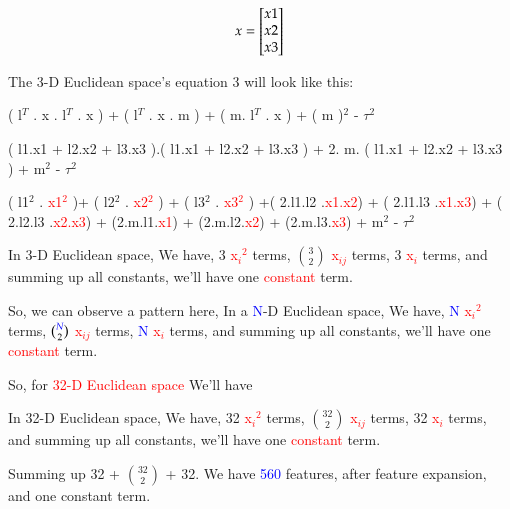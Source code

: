 \documentclass[11 pt]{article}
\begin{document}
{\[
x = \begin{bmatrix} x1 \\ x2 \\ x3 \\ \end{bmatrix}
\]

\vspace{\baselineskip}
The 3-D Euclidean space's equation 3 will look like this:

( l$^T$ . x . l$^T$ . x ) +  ( l$^T$ . x . m )  +   ( m. l$^T$ . x )  + ( m )$^2$ - $\tau$$^2$ 

( l1.x1 + l2.x2 + l3.x3 ).( l1.x1 + l2.x2 + l3.x3 ) + 2. m. ( l1.x1 + l2.x2 + l3.x3 ) + m$^2$ - $\tau$$^2$ 

( l1$^2$ . \textcolor{red}{x1$^2$} )+ ( l2$^2$ . \textcolor{red}{x2$^2$} ) + ( l3$^2$ . \textcolor{red}{x3$^2$} ) +( 2.l1.l2 .\textcolor{red}{x1.x2}) + ( 2.l1.l3 .\textcolor{red}{x1.x3}) + ( 2.l2.l3 .\textcolor{red}{x2.x3}) + (2.m.l1.\textcolor{red}{x1}) + (2.m.l2.\textcolor{red}{x2}) + (2.m.l3.\textcolor{red}{x3}) + m$^2$ - $\tau$$^2$ 

\vspace{\baselineskip}
\textbullet \hspace{0.3 cm} In 3-D Euclidean space, We have, 3 \textcolor{red}{x$_{i}$$^2$} terms, {\Large$\binom{3}{2}$} \textcolor{red}{x$_{ij}$} terms, 3 \textcolor{red}{x$_i$} terms, and summing up all constants, we'll have one \textcolor{red}{constant} term. 

\vspace{\baselineskip}
\textbullet \hspace{0.3 cm}So, we can observe a pattern here, In a \textcolor{blue}{N}-D Euclidean space, We have, \textcolor{blue}{N} \textcolor{red}{x$_{i}$$^2$} terms, {\Large$\binom{\textcolor{blue}{N}}{2}$} \textcolor{red}{x$_{ij}$} terms, \textcolor{blue}{N} \textcolor{red}{x$_i$} terms, and summing up all constants, we'll have one \textcolor{red}{constant} term. 



\vspace{\baselineskip}
\textbullet \hspace{0.3 cm} So, for \textcolor{red}{32-D Euclidean space} We'll have 

\textbullet \hspace{0.3 cm} In 32-D Euclidean space, We have, 32 \textcolor{red}{x$_{i}$$^2$} terms, {\Large$\binom{32}{2}$} \textcolor{red}{x$_{ij}$} terms, 32 \textcolor{red}{x$_i$} terms, and summing up all constants, we'll have one \textcolor{red}{constant} term. 

\textbullet \hspace{0.3 cm} Summing up 32 + {\Large$\binom{32}{2}$} + 32. We have {\Large\textcolor{blue}{560}} features, after feature expansion, and one constant term.

}
\end{document}
